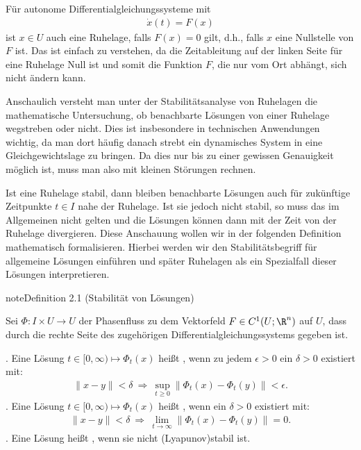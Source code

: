 \documentclass[letterpaper,10pt,english]{jupyterBook}
\begin{document}
\sphinxAtStartPar
Für autonome Differentialgleichungssysteme mit
\begin{equation*}
\begin{split}\dot{x}(t) = F(x)\end{split}
\end{equation*}
\sphinxAtStartPar
ist \(x \in U\) auch eine Ruhelage, falls \(F(x) = 0\) gilt, d.h., falls \(x\) eine Nullstelle von \(F\) ist.
Das ist einfach zu verstehen, da die Zeitableitung auf der linken Seite für eine Ruhelage Null ist und somit die Funktion \(F\), die nur vom Ort abhängt, sich nicht ändern kann.

\sphinxAtStartPar
Anschaulich versteht man unter der Stabilitätsanalyse von Ruhelagen die mathematische Untersuchung, ob benachbarte Lösungen von einer Ruhelage wegstreben oder nicht.
Dies ist insbesondere in technischen Anwendungen wichtig, da man dort häufig danach strebt ein dynamisches System in eine Gleichgewichtslage zu bringen.
Da dies nur bis zu einer gewissen Genauigkeit möglich ist, muss man also mit kleinen Störungen rechnen.

\sphinxAtStartPar
Ist eine Ruhelage stabil, dann bleiben benachbarte Lösungen auch für zukünftige Zeitpunkte \(t \in I\) nahe der Ruhelage.
Ist sie jedoch nicht stabil, so muss das im Allgemeinen nicht gelten und die Lösungen können dann mit der Zeit von der Ruhelage divergieren.
Diese Anschauung wollen wir in der folgenden Definition mathematisch formalisieren.
Hierbei werden wir den Stabilitätsbegriff für allgemeine Lösungen einführen und später Ruhelagen als ein Spezialfall dieser Lösungen interpretieren.
\label{ode_stability/stabilitaetsbegriffe:def:Stabilitaet}
\begin{sphinxadmonition}{note}{Definition 2.1 (Stabilität von Lösungen)}



\sphinxAtStartPar
Sei \(\Phi \colon I \times U \rightarrow U\) der Phasenfluss zu dem Vektorfeld \(F\in C^1(U;\R^n)\) auf \(U\), dass durch die rechte Seite des zugehörigen Differentialgleichungssystems gegeben ist.

. Eine Lösung \(t \in [0,\infty) \mapsto \Phi_t(x)\) heißt , wenn zu jedem \(\epsilon > 0\) ein \(\delta>0\) existiert mit:
\begin{equation*}
\begin{split}\|x-y\|<\delta \ \Rightarrow \ \sup_{t\geq0}\|\Phi_t(x)-\Phi_t(y)\|<\epsilon.\end{split}
\end{equation*}
. Eine Lösung \( t \in [0,\infty) \mapsto \Phi_t(x)\) heißt , wenn ein \(\delta > 0\) existiert mit:
\begin{equation*}
\begin{split}\|x-y\|<\delta \ \Rightarrow \ \lim_{t\to\infty}\|\Phi_t(x)-\Phi_t(y)\|=0.\end{split}
\end{equation*}
. Eine Lösung heißt , wenn sie nicht (Lyapunov\sphinxhyphen{})stabil ist.
\end{sphinxadmonition}
\end{document}
